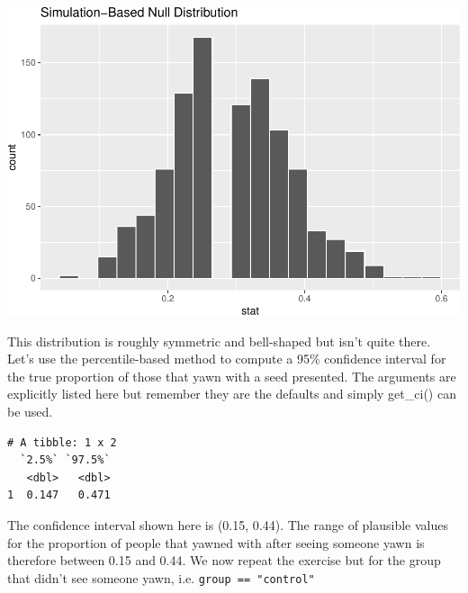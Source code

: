 \documentclass[]{article}
\newenvironment{Shaded}{\begin{snugshade}}{\end{snugshade}}
\newcommand{\KeywordTok}[1]{\textcolor[rgb]{0.13,0.29,0.53}{\textbf{#1}}}
\newcommand{\DataTypeTok}[1]{\textcolor[rgb]{0.13,0.29,0.53}{#1}}
\newcommand{\FloatTok}[1]{\textcolor[rgb]{0.00,0.00,0.81}{#1}}
\newcommand{\StringTok}[1]{\textcolor[rgb]{0.31,0.60,0.02}{#1}}
\newcommand{\OperatorTok}[1]{\textcolor[rgb]{0.81,0.36,0.00}{\textbf{#1}}}
\newcommand{\NormalTok}[1]{#1}
\begin{document}
\includegraphics{DAWeek7_files/figure-latex/yawn_get_ci2-1.pdf}

This distribution is roughly symmetric and bell-shaped but isn't quite
there. Let's use the percentile-based method to compute a 95\%
confidence interval for the true proportion of those that yawn with a
seed presented. The arguments are explicitly listed here but remember
they are the defaults and simply get\_ci() can be used.

\begin{Shaded}
\end{Shaded}

\begin{verbatim}
# A tibble: 1 x 2
  `2.5%` `97.5%`
   <dbl>   <dbl>
1  0.147   0.471
\end{verbatim}

The confidence interval shown here is (0.15, 0.44). The range of
plausible values for the proportion of people that yawned with after
seeing someone yawn is therefore between 0.15 and 0.44. We now repeat
the exercise but for the group that didn't see someone yawn, i.e.
\texttt{group\ ==\ "control"}
\end{document}
